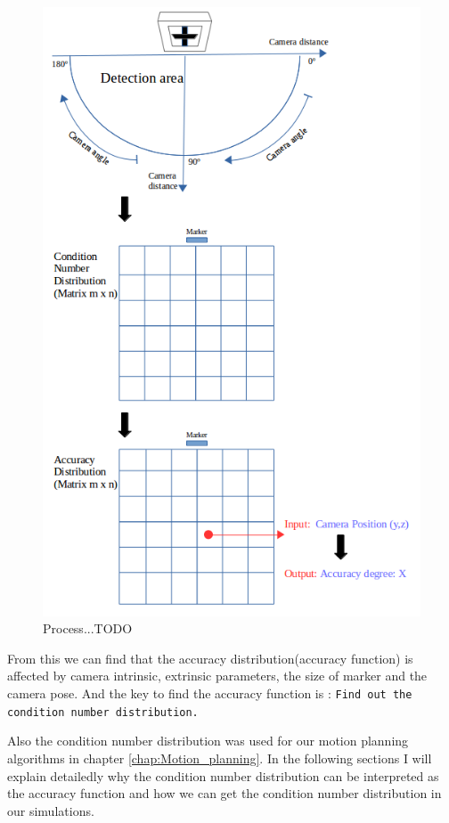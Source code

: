 \begin{figure}[H]
\hspace*{3cm}
\centering
\includegraphics[scale=0.8]{./fig/mc_process.png}
\caption{Process...TODO}  
\label{fig:mc_process}
\end{figure}

From this we can find that the accuracy distribution(accuracy function) is affected by camera intrinsic, extrinsic parameters, the size of marker and the camera pose. And the key to find the accuracy function is : \texttt{Find out the condition number distribution.} 

Also the condition number distribution was used for our motion planning algorithms in chapter \ref{chap:Motion_planning}. In the following sections I will explain detailedly why the condition number distribution can be interpreted as the accuracy function and how we can get the condition number distribution in our simulations.

